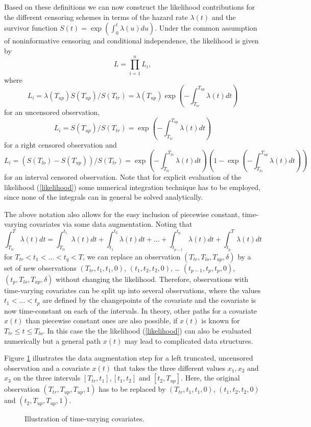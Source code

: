 \documentclass[11pt,a4paper,twoside]{bayesxarticle}
\begin{document}
Based on these definitions we can now construct the likelihood
contributions for the different censoring schemes in terms of the
hazard rate $\lambda(t)$ and the survivor function
$S(t)=\exp(\int_0^t\lambda(u)du)$. Under the common assumption of
noninformative censoring and conditional independence, the
likelihood is given by
\begin{equation}\label{likelihood}
 L=\prod_{i=1}^n L_i,
\end{equation}
where
\[L_i = \lambda(T_{up})S(T_{up})/S(T_{tr}) = \lambda(T_{up})\exp\left(-\int_{T_{tr}}^{T_{up}}\lambda(t)dt\right)\]
for an uncensored observation,
\[L_i = S(T_{up})/S(T_{tr}) = \exp\left(-\int_{T_{tr}}^{T_{up}}\lambda(t)dt\right)\]
for a right censored observation and
\[L_i = (S(T_{lo})-S(T_{up}))/S(T_{tr}) = \exp\left(-\int_{T_{tr}}^{T_{lo}}\lambda(t)dt\right)\left(1-\exp\left(-\int_{T_{lo}}^{T_{up}}\lambda(t)dt\right)\right)\]
for an interval censored observation. Note that for explicit
evaluation of the likelihood (\ref{likelihood}) some numerical
integration technique has to be employed, since none of the
integrals can in general be solved analytically.

The above notation also allows for the easy inclusion of piecewise
constant, time-varying covariates via some data augmentation. Noting
that
\[\int_{T_{tr}}^{T}\lambda(t)dt = \int_{T_{tr}}^{t_1}\lambda(t)dt + \int_{t_1}^{t_2}\lambda(t)dt + \ldots + \int_{t_{p-1}}^{t_p}\lambda(t)dt + \int_{t_p}^{T}\lambda(t)dt\]
for $T_{tr}<t_1<\ldots<t_q<T$, we can replace an observation
$(T_{tr},T_{lo},T_{up},\delta)$ by a set of new observations
$(T_{tr},t_1,t_1,0)$, $(t_1,t_2,t_2,0)$, \ldots
$(t_{p-1},t_p,t_p,0)$, $(t_{p},T_{lo},T_{up},\delta)$ without
changing the likelihood. Therefore, observations with time-varying
covariates can be split up into several observations, where the
values $t_1<\ldots<t_p$ are defined by the changepoints of the
covariate and the covariate is now time-constant on each of the
intervals. In theory, other paths for a covariate $x(t)$ than
piecewise constant ones are also possible, if $x(t)$ is known for
$T_{tr}\le t\le T_{lo}$. In this case the the likelihood
(\ref{likelihood}) can also be evaluated numerically but a general
path $x(t)$ may lead to complicated data structures.

Figure \ref{timevaryingcovs} illustrates the data augmentation step
for a left truncated, uncensored observation and a covariate $x(t)$
that takes the three different values $x_1,x_2$ and $x_3$ on the
three intervals $[T_{tr},t_1], [t_1,t_2]$ and $[t_2,T_{up}]$. Here,
the original observation $(T_{tr},T_{up},T_{up},1)$ has to be
replaced by $(T_{tr},t_1,t_1,0)$, $(t_1,t_2,t_2,0)$ and
$(t_2,T_{up},T_{up},1)$.
\begin{figure}[htb]
\begin{center}
{\it\caption{Illustration of time-varying
covariates.\label{timevaryingcovs}}}
\end{center}
\end{figure}
\end{document}
